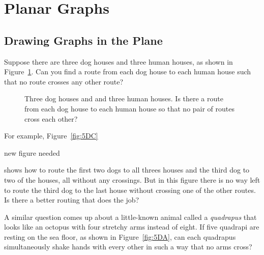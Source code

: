 
\begin{problems}
\classproblems
{}

\examproblems
{}

\homeworkproblems
{}
\end{problems}

\section{Planar Graphs}\label{planar_graphs_sec}

\subsection{Drawing Graphs in the Plane}

Suppose there are three dog houses and three human houses, as shown in
Figure~\ref{fig:5DP}.  Can you find a route from each dog house to
each human house such that no route crosses any other route?

\begin{figure}


\caption{Three dog houses and and three human houses.  Is there a
  route from each dog house to each human house so that no pair of
  routes cross each other?}
\label{fig:5DP}
\end{figure}

For example, Figure~\ref{fig:5DC} \begin{editingnotes}
new figure needed
\end{editingnotes} shows how to route the first two dogs to all threes
houses and the third dog to two of the houses, all without any crossings.
But in this figure there is no way left to route the third dog to the last
house without crossing one of the other routes.  Is there a better routing
that does the job?

A similar question comes up about a little-known animal called a
\emph{quadrapus} that looks like an octopus with four stretchy arms
instead of eight.  If five quadrapi are resting on the sea floor, as shown
in Figure~\ref{fig:5DA}, can each quadrapus simultaneously shake hands
with every other in such a way that no arms cross?

